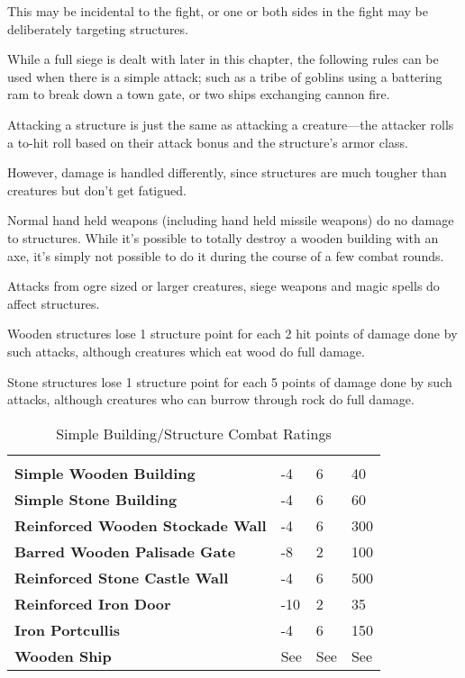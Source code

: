 \begin{multicols*}{2}
This may be incidental to the fight, or one or both sides in the fight may be deliberately targeting structures.

While a full siege is dealt with later in this chapter, the following rules can be used when there is a simple attack; such as a tribe of goblins using a battering ram to break down a town gate, or two ships exchanging cannon fire.

Attacking a structure is just the same as attacking a creature—the attacker rolls a to-hit roll based on their attack bonus and the structure’s armor class.

However, damage is handled differently, since structures are much tougher than creatures but don’t get fatigued.

Normal hand held weapons (including hand held missile weapons) do no damage to structures. While it’s possible to totally destroy a wooden building with an axe, it’s simply not possible to do it during the course of a few combat rounds.

Attacks from ogre sized or larger creatures, siege weapons and magic spells do affect structures.

Wooden structures lose 1 structure point for each 2 hit points of damage done by such attacks, although creatures which eat wood do full damage.

Stone structures lose 1 structure point for each 5 points of damage done by such attacks, although creatures who can burrow through rock do full damage.

\begin {table}[H]
  \caption{Simple Building/Structure Combat Ratings}
	\begin{tabularx}{\columnwidth}{>{\bfseries}M{1in}YYY}
	 &  &  & \\
	Simple Wooden Building & -4 & 6 & 40\\
	Simple Stone Building & -4 & 6 & 60\\
	Reinforced Wooden Stockade Wall & -4 & 6 & 300\\
	Barred Wooden Palisade Gate & -8 & 2 & 100\\
	Reinforced Stone Castle Wall & -4 & 6 & 500\\
	Reinforced Iron Door & -10 & 2 & 35\\
	Iron Portcullis & -4 & 6 & 150\\
	Wooden Ship & See  & See  & See 
  \end {tabularx}
\end {table}


\end{multicols*}
